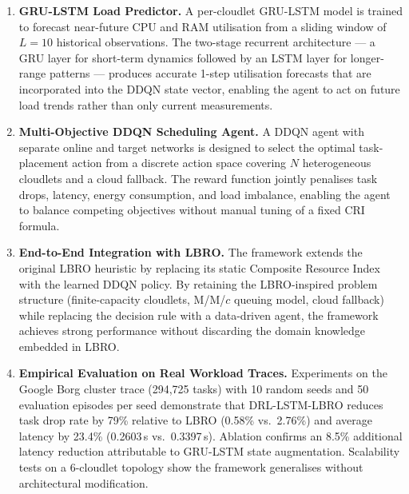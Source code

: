 \begin{enumerate}

  \item \textbf{GRU-LSTM Load Predictor.}
  A per-cloudlet GRU-LSTM model is trained to forecast
  near-future CPU and RAM utilisation from a sliding window
  of $L = 10$ historical observations. The two-stage
  recurrent architecture — a GRU layer for short-term
  dynamics followed by an LSTM layer for longer-range
  patterns — produces accurate 1-step utilisation forecasts
  that are incorporated into the DDQN state vector, enabling
  the agent to act on future load trends rather than only
  current measurements.

  \item \textbf{Multi-Objective DDQN Scheduling Agent.}
  A DDQN agent with separate online and target networks is
  designed to select the optimal task-placement action from
  a discrete action space covering $N$ heterogeneous
  cloudlets and a cloud fallback. The reward function jointly
  penalises task drops, latency, energy consumption, and load
  imbalance, enabling the agent to balance competing
  objectives without manual tuning of a fixed CRI formula.

  \item \textbf{End-to-End Integration with LBRO.}
  The framework extends the original LBRO heuristic by
  replacing its static Composite Resource Index with the
  learned DDQN policy. By retaining the LBRO-inspired
  problem structure (finite-capacity cloudlets, M/M/$c$
  queuing model, cloud fallback) while replacing the
  decision rule with a data-driven agent, the framework
  achieves strong performance without discarding the
  domain knowledge embedded in LBRO.

  \item \textbf{Empirical Evaluation on Real Workload Traces.}
  Experiments on the Google Borg cluster trace (294,725
  tasks) with 10 random seeds and 50 evaluation episodes
  per seed demonstrate that DRL-LSTM-LBRO reduces task drop
  rate by 79\% relative to LBRO (0.58\% vs.\ 2.76\%) and
  average latency by 23.4\% (0.2603\,s vs.\ 0.3397\,s).
  Ablation confirms an 8.5\% additional latency reduction
  attributable to GRU-LSTM state augmentation. Scalability
  tests on a 6-cloudlet topology show the framework
  generalises without architectural modification.

\end{enumerate}

